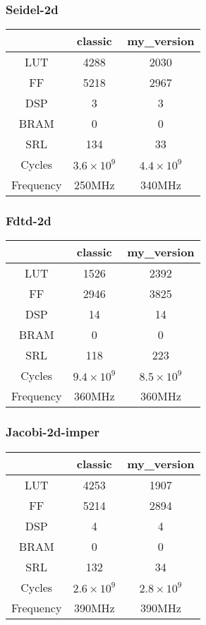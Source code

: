 \documentclass[10pt,a4paper,twoside]{article}
\begin{document}
\subsubsection{Seidel-2d}

\begin{tabular}{|c|c|c|}
	\hline
     & classic & my\_version \\
    \hline
    LUT & 4288 & 2030 \\
    \hline
    FF & 5218 & 2967  \\
    \hline
    DSP & 3 & 3 \\
    \hline
    BRAM & 0 & 0  \\
    \hline
    SRL & 134 & 33 \\
    \hline
    Cycles & $3.6 \times 10^9$ & $4.4 \times 10^9$  \\
    \hline
	Frequency & 250MHz & 340MHz \\
	\hline
\end{tabular}

\subsubsection{Fdtd-2d}

\begin{tabular}{|c|c|c|}
	\hline
     & classic & my\_version \\
    \hline
    LUT & 1526 & 2392 \\
    \hline
    FF & 2946 & 3825  \\
    \hline
    DSP & 14 & 14 \\
    \hline
    BRAM & 0 & 0 \\
    \hline
    SRL & 118 & 223  \\
    \hline
    Cycles & $9.4 \times 10^9$ & $8.5 \times 10^9$  \\
    \hline
	Frequency & 360MHz & 360MHz \\
	\hline
\end{tabular}

\subsubsection{Jacobi-2d-imper}

\begin{tabular}{|c|c|c|}
	\hline
     & classic & my\_version \\
    \hline
    LUT & 4253 & 1907 \\
    \hline
    FF & 5214 & 2894\\
    \hline
    DSP & 4 & 4 \\
    \hline
    BRAM & 0 & 0\\
    \hline
    SRL & 132 & 34  \\
    \hline
    Cycles & $2.6 \times 10^9$ & $2.8 \times 10^9$\\
    \hline
	Frequency & 390MHz & 390MHz\\
	\hline
\end{tabular}
\end{document}
